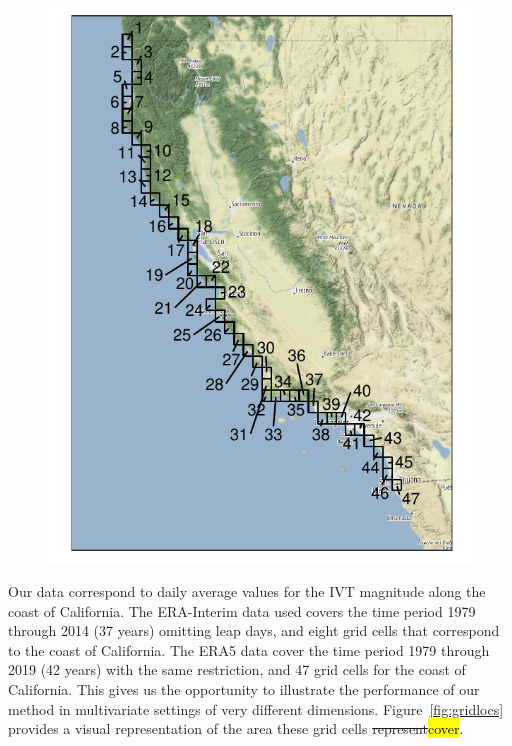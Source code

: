 \documentclass[iicol,sn-basic]{sn-jnl}
\theoremstyle{thmstyleone}
\begin{document}
\begin{figure}[tb]
\begin{minipage}{0.25\textwidth}
\includegraphics[width=0.99\linewidth]{./images/era5_grid}
\end{minipage}
\end{figure}

Our data correspond to daily average values for the IVT magnitude along the coast of California.  The ERA-Interim data used covers the time period 1979 through 2014 (37 years) omitting leap days, and eight grid cells that correspond to the coast of California.  The ERA5 data cover the time period 1979 through 2019 (42 years) with the same restriction, and  47 grid cells for the coast of California.  This gives us the opportunity to illustrate the performance of our method in multivariate settings of very different dimensions. Figure~\ref{fig:gridlocs} provides a visual representation of the area these grid cells \st{represent}\hl{cover}.
\end{document}
